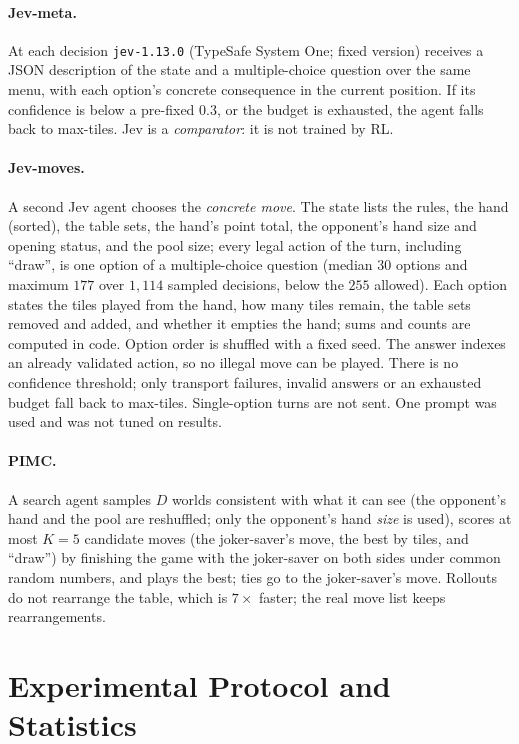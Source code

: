 \documentclass[11pt]{article}
\begin{document}
\paragraph{Jev-meta.} At each decision \texttt{jev-1.13.0} (TypeSafe System One; fixed version) receives a JSON description of the state and a multiple-choice question over the same menu, with each option's concrete consequence in the current position. If its confidence is below a pre-fixed $0.3$, or the budget is exhausted, the agent falls back to max-tiles. Jev is a \emph{comparator}: it is not trained by RL.

\paragraph{Jev-moves.} A second Jev agent chooses the \emph{concrete move}. The state lists the rules, the hand (sorted), the table sets, the hand's point total, the opponent's hand size and opening status, and the pool size; every legal action of the turn, including ``draw'', is one option of a multiple-choice question (median $30$ options and maximum $177$ over $1{,}114$ sampled decisions, below the $255$ allowed). Each option states the tiles played from the hand, how many tiles remain, the table sets removed and added, and whether it empties the hand; sums and counts are computed in code. Option order is shuffled with a fixed seed. The answer indexes an already validated action, so no illegal move can be played. There is no confidence threshold; only transport failures, invalid answers or an exhausted budget fall back to max-tiles. Single-option turns are not sent. One prompt was used and was not tuned on results.

\paragraph{PIMC.} A search agent samples $D$ worlds consistent with what it can see (the opponent's hand and the pool are reshuffled; only the opponent's hand \emph{size} is used), scores at most $K=5$ candidate moves (the joker-saver's move, the best by tiles, and ``draw'') by finishing the game with the joker-saver on both sides under common random numbers, and plays the best; ties go to the joker-saver's move. Rollouts do not rearrange the table, which is $7\times$ faster; the real move list keeps rearrangements.

\section{Experimental Protocol and Statistics}\label{sec:protocol}
\end{document}
